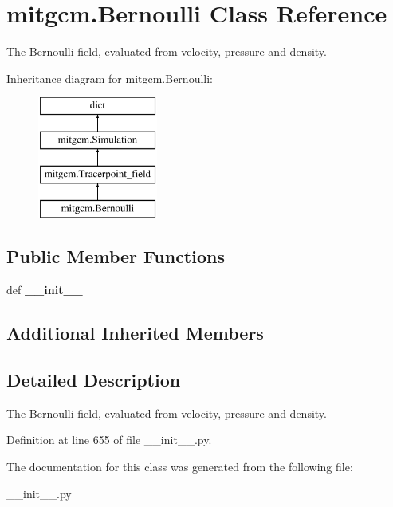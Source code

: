 \hypertarget{classmitgcm_1_1Bernoulli}{\section{mitgcm.\+Bernoulli Class Reference}
\label{classmitgcm_1_1Bernoulli}
}


The \hyperlink{classmitgcm_1_1Bernoulli}{Bernoulli} field, evaluated from velocity, pressure and density.  


Inheritance diagram for mitgcm.\+Bernoulli\+:\begin{figure}[H]
\begin{center}
\leavevmode
\includegraphics[height=4.000000cm]{classmitgcm_1_1Bernoulli}
\end{center}
\end{figure}
\subsection*{Public Member Functions}
\begin{DoxyCompactItemize}
\item 
\hypertarget{classmitgcm_1_1Bernoulli_a5f78ab27df77454ef131f5c24ca8dbf9}{def {\bfseries \+\_\+\+\_\+init\+\_\+\+\_\+}}\label{classmitgcm_1_1Bernoulli_a5f78ab27df77454ef131f5c24ca8dbf9}

\end{DoxyCompactItemize}
\subsection*{Additional Inherited Members}


\subsection{Detailed Description}
The \hyperlink{classmitgcm_1_1Bernoulli}{Bernoulli} field, evaluated from velocity, pressure and density. 



Definition at line 655 of file \+\_\+\+\_\+init\+\_\+\+\_\+.\+py.



The documentation for this class was generated from the following file\+:\begin{DoxyCompactItemize}
\item 
\+\_\+\+\_\+init\+\_\+\+\_\+.\+py\end{DoxyCompactItemize}
